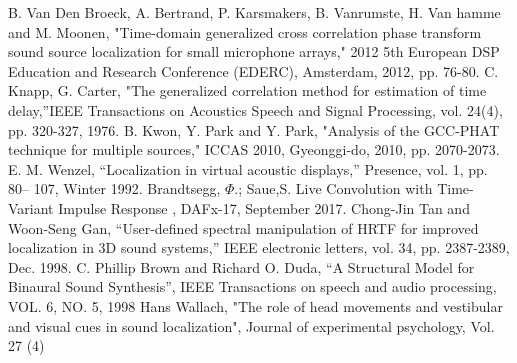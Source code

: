 \documentclass[BTech]{nitkdiss}
\begin{document}
\begin{thebibliography}{9}
B. Van Den Broeck, A. Bertrand, P. Karsmakers, B. Vanrumste, H. Van hamme and M. Moonen, "Time-domain generalized cross correlation phase transform sound source localization for small microphone arrays," 2012 5th European DSP Education and Research Conference (EDERC), Amsterdam, 2012, pp. 76-80.
C. Knapp, G. Carter, "The generalized correlation method for estimation of time delay,''IEEE Transactions on Acoustics Speech and Signal Processing, vol. 24(4), pp. 320-327, 1976.
B. Kwon, Y. Park and Y. Park, "Analysis of the GCC-PHAT technique for multiple sources," ICCAS 2010, Gyeonggi-do, 2010, pp. 2070-2073.
E. M. Wenzel, “Localization in virtual acoustic displays,” Presence, vol. 1, pp. 80– 107, Winter 1992.
 Brandtsegg, $\Phi$.; Saue,S. Live Convolution with Time-Variant Impulse Response , DAFx-17, September 2017.
Chong-Jin Tan and Woon-Seng Gan, “User-defined spectral manipulation of HRTF for improved localization in 3D sound systems,” IEEE electronic letters, vol. 34, pp. 2387-2389, Dec. 1998. 
C. Phillip Brown and Richard O. Duda, “A Structural Model for Binaural Sound Synthesis”, IEEE Transactions on 
speech and audio processing, VOL. 6, NO. 5, 1998
Hans Wallach, "The role of head movements and vestibular and visual cues in sound localization", Journal of experimental psychology, Vol. 27 (4)
\end{thebibliography}
\end{document}

